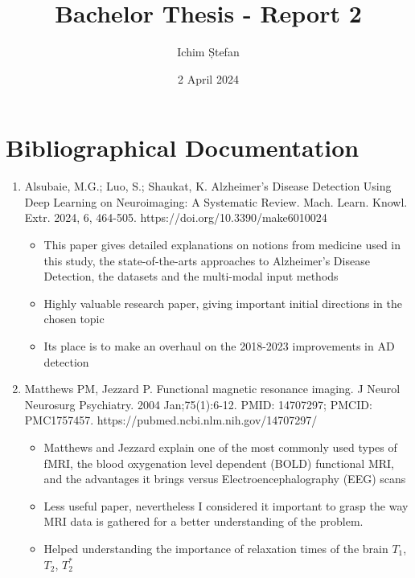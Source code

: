 \documentclass[a4paper]{article}
\title{
    Bachelor Thesis - Report 2
}
\author{Ichim Ștefan}
\date{2 April 2024}
\begin{document}
\maketitle


\section*{Bibliographical Documentation}
\begin{enumerate}
      \item Alsubaie, M.G.; Luo, S.; Shaukat, K. Alzheimer's Disease Detection Using Deep Learning on Neuroimaging:
            A Systematic Review. Mach. Learn. Knowl. Extr. 2024, 6, 464-505. https://doi.org/10.3390/make6010024
            \begin{itemize}
                  \item This paper gives detailed explanations on notions from medicine used in this study,
                        the state-of-the-arts approaches to Alzheimer's Disease Detection, the datasets and the multi-modal
                        input methods
                  \item Highly valuable research paper, giving important initial directions in the chosen topic
                  \item Its place is to make an overhaul on the 2018-2023 improvements in AD detection
            \end{itemize}
      \item Matthews PM, Jezzard P. Functional magnetic resonance imaging. J Neurol Neurosurg Psychiatry.
            2004 Jan;75(1):6-12. PMID: 14707297; PMCID: PMC1757457. https://pubmed.ncbi.nlm.nih.gov/14707297/
            \begin{itemize}
                  \item Matthews and Jezzard explain one of the most commonly used types of fMRI, the
                        blood oxygenation level dependent (BOLD) functional MRI, and the advantages
                        it brings versus Electroencephalography (EEG) scans
                  \item Less useful paper, nevertheless I considered it important to grasp the way MRI data
                        is gathered for a better understanding of the problem.
                  \item Helped understanding the importance of relaxation times of the brain
                        $T_1$, $T_2$, $T_2^*$
            \end{itemize}

\end{enumerate}
\end{document}
